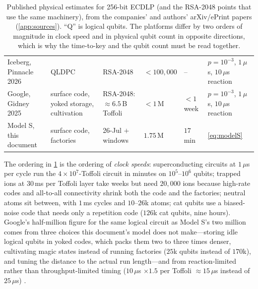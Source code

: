 \begin{table}[H]
\begin{tabular}{@{}p{2.8cm}p{2.4cm}p{2.4cm}p{2.1cm}p{2.0cm}p{3.5cm}@{}}
Iceberg, Pinnacle 2026 \cite{pinnacle26} & QLDPC & RSA-2048 & $<100{,}000$ & -- & $p=10^{-3}$, $1\,\mu$s, $10\,\mu$s reaction\\
Google, Gidney 2025 \cite{gidney25rsa} & surface code, yoked storage, cultivation & RSA-2048: $\approx6.5$\,B Toffoli & $<1$\,M & $<1$ week & $p=10^{-3}$, $1\,\mu$s, $10\,\mu$s reaction\\
Model S, this document & surface code, factories & 26-Jul \ecdsafail{} $+$ windows & $1.75$\,M & $17$\,min & \cref{eq:modelS}\\
\bottomrule
\end{tabular}
\caption{Published physical estimates for 256-bit ECDLP (and the RSA-2048 points that use the same machinery), from the companies' and authors' arXiv/ePrint papers (\cref{app:sources}). ``Q'' is logical qubits. The platforms differ by two orders of magnitude in clock speed and in physical qubit count in opposite directions, which is why the time-to-key and the qubit count must be read together.}
\label{tab:external-phys}
\end{table}

The ordering in \cref{tab:external-phys} is the ordering of \emph{clock speeds}: superconducting circuits at $1\,\mu$s per cycle run the $4\times10^7$-Toffoli circuit in minutes on $10^5$--$10^6$ qubits; trapped ions at $30$\,ms per Toffoli layer take weeks but need $20{,}000$ ions because high-rate codes and all-to-all connectivity shrink both the code and the factories; neutral atoms sit between, with $1$\,ms cycles and $10$--$26$k atoms; cat qubits use a biased-noise code that needs only a repetition code ($126$k cat qubits, nine hours). Google's half-million figure for the same logical circuit as Model S's two million comes from three choices this document's model does not make---storing idle logical qubits in yoked codes, which packs them two to three times denser, cultivating magic states instead of running factories ($25$k qubits instead of $170$k), and tuning the distance to the actual run length---and from reaction-limited rather than throughput-limited timing ($10\,\mu$s $\times1.5$ per Toffoli $\approx15\,\mu$s instead of $25\,\mu$s) \cite{babbush26}.

